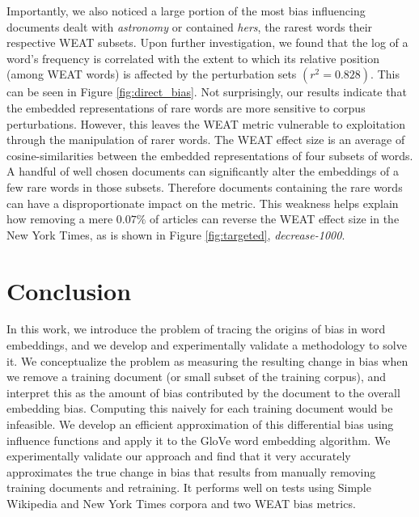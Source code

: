 \documentclass{article}
\newcommand{\xhdr}[1]{\paragraph*{\bf {#1.}}}
\begin{document}
Importantly, we also noticed a large portion of the most bias influencing documents dealt with \textit{astronomy} or contained \textit{hers}, the rarest words their respective WEAT subsets.
Upon further investigation, we found that the log of a word's frequency is correlated with the extent to which its relative position (among WEAT words) is affected by the perturbation sets $(r^2 = 0.828)$.
This can be seen in Figure \ref{fig:direct_bias}.
Not surprisingly, our results indicate that the embedded representations of rare words are more sensitive to corpus perturbations.
However, this leaves the WEAT metric vulnerable to exploitation through the manipulation of rarer words.
The WEAT effect size is an average of cosine-similarities between the embedded representations of four subsets of words. 
A handful of well chosen documents can significantly alter the embeddings of a few rare words in those subsets.
Therefore documents containing the rare words can have a disproportionate impact on the metric. 
This weakness helps explain how removing a mere $0.07\%$ of articles can reverse the WEAT effect size in the New York Times, as is shown in Figure \ref{fig:targeted}, \textit{decrease-1000}. 



\section{Conclusion} \label{discussion}
In this work, we introduce the problem of tracing the origins of bias in word embeddings, and we develop and experimentally validate a methodology to solve it. We conceptualize the problem as measuring the resulting change in bias when we remove a training document (or small subset of the training corpus), and interpret this as the amount of bias contributed by the document to the overall embedding bias. 
Computing this naively for each training document would be infeasible.
We develop an efficient approximation of this differential bias using influence functions and apply it to the GloVe word embedding algorithm.
We experimentally validate our approach and find that it very accurately approximates the true change in bias that results from manually removing training documents and retraining.
It performs well on tests using Simple Wikipedia and New York Times corpora and two WEAT bias metrics. 
\end{document}
